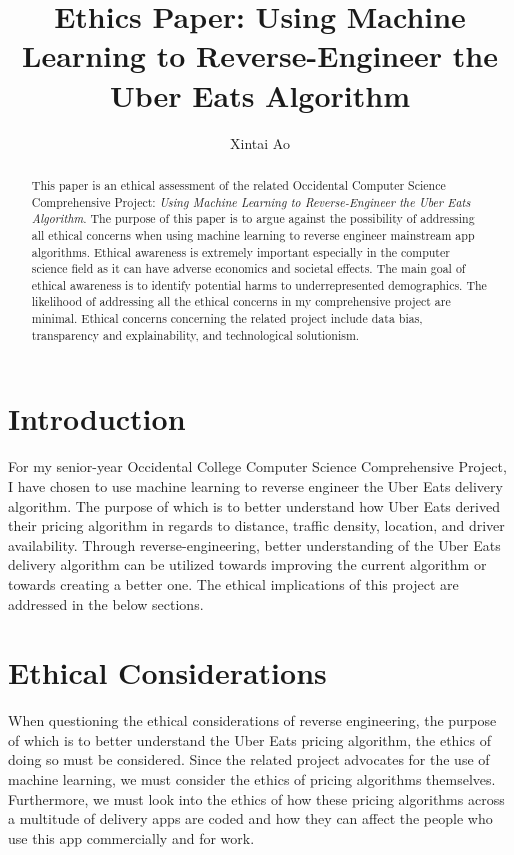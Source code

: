 \documentclass[10pt,twocolumn]{article}
\title{Ethics Paper: Using Machine Learning to Reverse-Engineer the Uber Eats Algorithm}
\author{Xintai Ao}
\affiliation{Occidental College}
\begin{document}
\maketitle

\begin{abstract}

 This paper is an ethical assessment of the related Occidental Computer Science Comprehensive Project: \textit{Using Machine Learning to Reverse-Engineer the Uber Eats Algorithm}. The purpose of this paper is to argue against the possibility of addressing all ethical concerns when using machine learning to reverse engineer mainstream app algorithms. Ethical awareness is extremely important especially in the computer science field as it can have adverse economics and societal effects. The main goal of ethical awareness is to identify potential harms to underrepresented demographics. The likelihood of addressing all the ethical concerns in my comprehensive project are minimal. Ethical concerns concerning the related project include data bias,  transparency and explainability, and technological solutionism. 
    
\end{abstract}

\section{Introduction}

For my senior-year Occidental College Computer Science Comprehensive Project, I have chosen to use machine learning to reverse engineer the Uber Eats delivery algorithm. The purpose of which is to better understand how Uber Eats derived their pricing algorithm in regards to distance, traffic density, location, and driver availability. Through reverse-engineering, better understanding of the Uber Eats delivery algorithm can be utilized towards improving the current algorithm or towards creating a better one. The ethical implications of this project are addressed in the below sections.

\section{Ethical Considerations}

When questioning the ethical considerations of reverse engineering, the purpose of which is to better understand the Uber Eats pricing algorithm, the ethics of doing so must be considered. Since the related project advocates for the use of machine learning, we must consider the ethics of pricing algorithms themselves. Furthermore, we must look into the ethics of how these pricing algorithms across a multitude of delivery apps are coded and how they can affect the people who use this app commercially and for work. 
\end{document}
